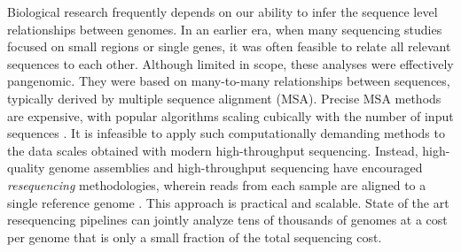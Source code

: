 
Biological research frequently depends on our ability to infer the sequence level relationships between genomes.
In an earlier era, when many sequencing studies focused on small regions or single genes, it was often feasible to relate all relevant sequences to each other.
Although limited in scope, these analyses were effectively pangenomic.
They were based on many-to-many relationships between sequences, typically derived by multiple sequence alignment (MSA).
Precise MSA methods are expensive, with popular algorithms scaling cubically with the number of input sequences \cite{notredame2000t}.
It is infeasible to apply such computationally demanding methods to the data scales obtained with modern high-throughput sequencing. %
Instead, high-quality genome assemblies and high-throughput sequencing have encouraged \emph{resequencing} methodologies, wherein reads from each sample are aligned to a single reference genome \cite{stratton2008genome}.
This approach is practical and scalable.
State of the art resequencing pipelines can jointly analyze tens of thousands of genomes \cite{Poplin_2017} at a cost per genome that is only a small fraction of the total sequencing cost.




